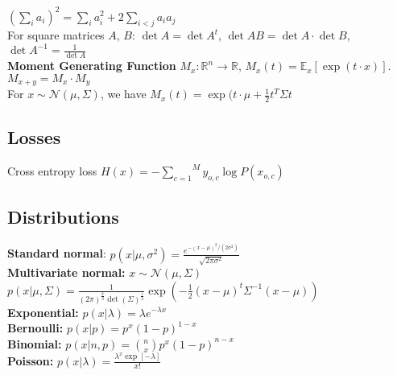 $\left( \underset{i}{\sum}a_i\right)^2 = \underset{i}{\sum}a_i^2 + 2\underset{i<j}{\sum}a_ia_j$\\
For square matrices $A$, $B$: $\det A = \det A^t$, $\det AB = \det A \cdot \det B$, $\det A^{-1} = \frac{1}{\det A }$\\
\textbf{Moment Generating Function}
$M_x :\mathbb{R}^n \rightarrow \mathbb{R}$, $M_x(t) = \mathbb{E}_x[\exp(t\cdot x)]$. $M_{x+y} = M_x\cdot M_y$\\
For $x \sim \mathcal{N}(\mu, \Sigma)$, we have $M_x(t) = \exp(t\cdot\mu + \frac{1}{2}t^T\Sigma t$
\subsection*{Losses}
Cross entropy loss $H(x) = -\overset{M}{\underset{c=1}{\sum}} y_{o,c}\log P(x_{o,c})$ \\


\subsection*{Distributions}
\textbf{Standard normal}: $p(x|\mu, \sigma^2)=\frac{e^{-(x-\mu)^2/(2\sigma^2)}}{\sqrt{2\pi\sigma^2}}$\\
\textbf{Multivariate normal:} $x \sim \mathcal{N}(\mu, \Sigma)$\\
$p(x|\mu, \Sigma) = \frac{1}{(2\pi)^\frac{k}{2}\det(\Sigma)^{\frac{1}{2}}} \exp(-\frac{1}{2}(x-\mu)^t\Sigma^{-1}(x-\mu))$\\
\textbf{Exponential:} $p(x|\lambda)=\lambda e^{-\lambda x}$\\
\textbf{Bernoulli:} $p(x|p)=p^x (1-p)^{1-x}$\\
\textbf{Binomial:} $p(x|n,p)={n\choose x}p^x (1-p)^{n-x}$\\
\textbf{Poisson:} $p(x|\lambda)=\frac{\lambda^x\exp[-\lambda]}{x!}$